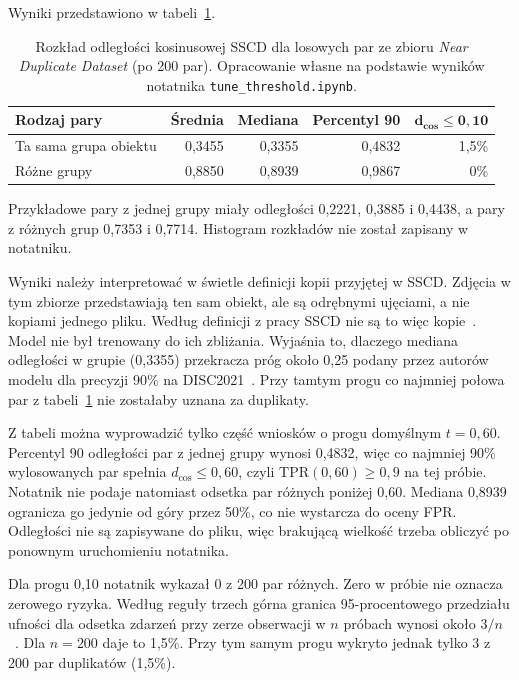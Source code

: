 Wyniki przedstawiono w tabeli~\ref{tab:tune-threshold}.

\begin{table}[!htbp]
\centering
\caption{Rozkład odległości kosinusowej SSCD dla losowych par ze zbioru
\textit{Near Duplicate Dataset} (po 200 par).
Opracowanie własne na podstawie wyników notatnika
\texttt{tune\_threshold.ipynb}.}
\label{tab:tune-threshold}
\begin{tabular}{|l|r|r|r|r|}
\hline
\textbf{Rodzaj pary} & \textbf{Średnia} & \textbf{Mediana} &
\textbf{Percentyl 90} & \(\boldsymbol{d_{\cos}\leq0{,}10}\) \\
\hline
Ta sama grupa obiektu & 0,3455 & 0,3355 & 0,4832 & 1,5\% \\
Różne grupy & 0,8850 & 0,8939 & 0,9867 & 0\% \\
\hline
\end{tabular}
\end{table}

Przykładowe pary z jednej grupy miały odległości 0,2221, 0,3885
i 0,4438, a pary z różnych grup 0,7353 i 0,7714. Histogram
rozkładów nie został zapisany w notatniku.

Wyniki należy interpretować w świetle definicji kopii przyjętej
w SSCD. Zdjęcia w tym zbiorze przedstawiają ten sam obiekt, ale są
odrębnymi ujęciami, a nie kopiami jednego pliku. Według definicji
z pracy SSCD nie są to więc kopie~\cite{pizzi2022sscd}. Model nie był
trenowany do ich zbliżania. Wyjaśnia to, dlaczego mediana odległości
w grupie (0,3355) przekracza próg około 0,25 podany przez autorów
modelu dla precyzji 90\% na DISC2021~\cite{sscd_repo}. Przy tamtym
progu co najmniej połowa par z tabeli~\ref{tab:tune-threshold} nie
zostałaby uznana za duplikaty.

Z tabeli można wyprowadzić tylko część wniosków o progu domyślnym
\(t=0{,}60\). Percentyl 90 odległości par z jednej grupy wynosi
0,4832, więc co najmniej 90\% wylosowanych par spełnia
\(d_{\cos}\leq0{,}60\), czyli \(\mathrm{TPR}(0{,}60)\geq0{,}9\)
na tej próbie. Notatnik nie podaje natomiast odsetka par różnych
poniżej 0,60. Mediana 0,8939 ogranicza go jedynie od góry przez 50\%,
co nie wystarcza do oceny FPR. Odległości nie są zapisywane do pliku, więc brakującą wielkość
trzeba obliczyć po ponownym uruchomieniu notatnika.

Dla progu 0,10 notatnik wykazał 0 z 200 par różnych. Zero
w próbie nie oznacza zerowego ryzyka. Według reguły trzech górna
granica 95-procentowego przedziału ufności dla odsetka zdarzeń przy
zerze obserwacji w \(n\) próbach wynosi około
\(3/n\)~\cite{hanley1983rule}. Dla \(n=200\) daje to 1,5\%. Przy tym
samym progu wykryto jednak tylko 3 z 200 par duplikatów (1,5\%).

